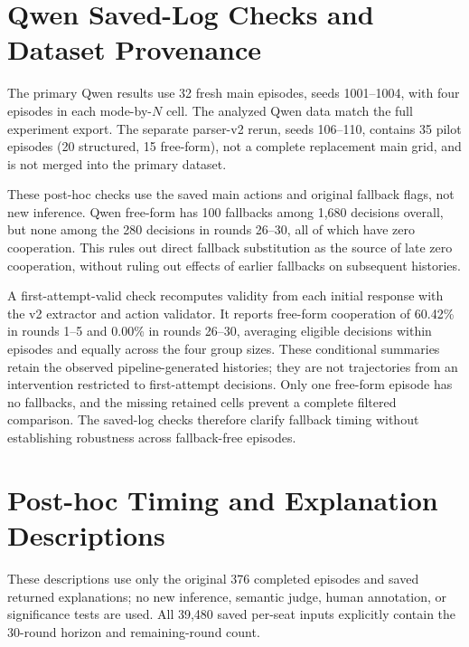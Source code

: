 \documentclass[11pt]{article}
\begin{document}
\section{Qwen Saved-Log Checks and Dataset Provenance}
\label{sec:qwen-log-check}
The primary Qwen results use 32 fresh main episodes, seeds 1001--1004, with four episodes in each mode-by-$N$ cell. The analyzed Qwen data match the full experiment export. The separate parser-v2 rerun, seeds 106--110, contains 35 pilot episodes (20 structured, 15 free-form), not a complete replacement main grid, and is not merged into the primary dataset.

These post-hoc checks use the saved main actions and original fallback flags, not new inference. Qwen free-form has 100 fallbacks among 1{,}680 decisions overall, but none among the 280 decisions in rounds 26--30, all of which have zero cooperation. This rules out direct fallback substitution as the source of late zero cooperation, without ruling out effects of earlier fallbacks on subsequent histories.

A first-attempt-valid check recomputes validity from each initial response with the v2 extractor and action validator. It reports free-form cooperation of 60.42\% in rounds 1--5 and 0.00\% in rounds 26--30, averaging eligible decisions within episodes and equally across the four group sizes. These conditional summaries retain the observed pipeline-generated histories; they are not trajectories from an intervention restricted to first-attempt decisions. Only one free-form episode has no fallbacks, and the missing retained cells prevent a complete filtered comparison. The saved-log checks therefore clarify fallback timing without establishing robustness across fallback-free episodes.



\section{Post-hoc Timing and Explanation Descriptions}
\label{sec:log-descriptions}
These descriptions use only the original 376 completed episodes and saved
returned explanations; no new inference, semantic judge, human annotation,
or significance tests are used. All 39{,}480 saved per-seat inputs explicitly
contain the 30-round horizon and remaining-round count.
\end{document}
